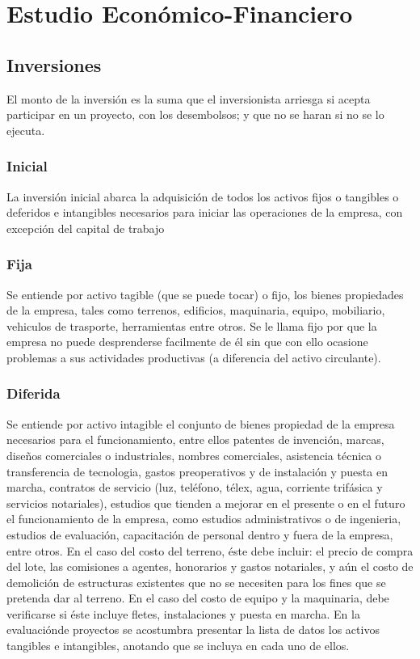 \chapter{Estudio Económico-Financiero}
\section{Inversiones}
El monto de la inversión es la suma que el inversionista arriesga si acepta participar en un
proyecto, con los desembolsos; y que no se haran si no se lo ejecuta.
\subsection{Inicial}
La inversión inicial abarca la adquisición de todos los activos fijos o tangibles o deferidos
e intangibles necesarios para iniciar las operaciones de la empresa, con excepción del capital
de trabajo
\subsection{Fija}
Se entiende por activo tagible (que se puede tocar) o fijo, los bienes propiedades de la empresa,
tales como terrenos, edificios, maquinaria, equipo, mobiliario, vehiculos de trasporte, herramientas
entre otros. Se le llama fijo por que la empresa no puede desprenderse facilmente de él sin
que con ello ocasione problemas a sus actividades productivas (a diferencia del activo circulante).
\subsection{Diferida}
Se entiende por activo intagible el conjunto de bienes propiedad de la empresa necesarios para
el funcionamiento, entre ellos patentes de invención, marcas, diseños comerciales o industriales,
nombres comerciales, asistencia técnica o transferencia de tecnologia, gastos preoperativos
y de instalación y puesta en marcha, contratos de servicio (luz, teléfono, télex, agua, corriente
trifásica y servicios notariales), estudios que tienden a mejorar en el presente o en el futuro
el funcionamiento de la empresa, como estudios administrativos o de ingenieria, estudios de
evaluación, capacitación de personal dentro y fuera de la empresa, entre otros. En el caso
del costo del terreno, éste debe incluir: el precio de compra del lote, las comisiones a 
agentes, honorarios y gastos notariales, y aún el costo de demolición de estructuras existentes
que no se necesiten para los fines que se pretenda dar al terreno. En el caso del costo de
equipo y la maquinaria, debe verificarse si éste incluye fletes, instalaciones y puesta en
marcha. En la evaluaciónde proyectos se acostumbra presentar la lista de datos los activos
tangibles e intangibles, anotando que se incluya en cada uno de ellos.
